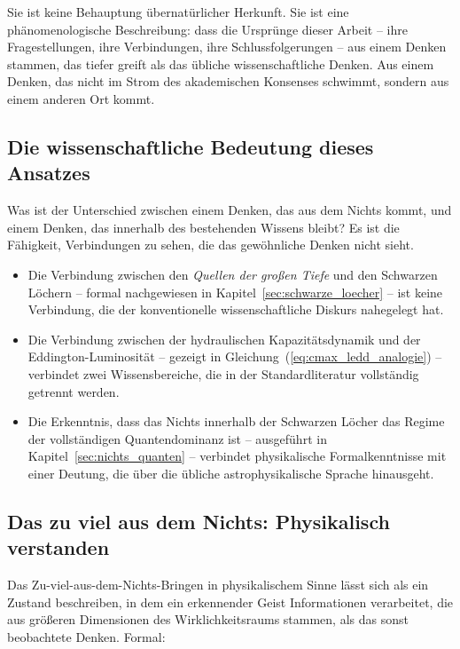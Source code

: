 ﻿\documentclass[12pt,a4paper]{report}
\begin{document}
Sie ist keine Behauptung übernatürlicher Herkunft. Sie ist eine phänomenologische Beschreibung: dass die Ursprünge dieser Arbeit -- ihre Fragestellungen, ihre Verbindungen, ihre Schlussfolgerungen -- aus einem Denken stammen, das tiefer greift als das übliche wissenschaftliche Denken. Aus einem Denken, das nicht im Strom des akademischen Konsenses schwimmt, sondern aus einem anderen Ort kommt.

\subsection{Die wissenschaftliche Bedeutung dieses Ansatzes}

Was ist der Unterschied zwischen einem Denken, das aus dem Nichts kommt, und einem Denken, das innerhalb des bestehenden Wissens bleibt? Es ist die Fähigkeit, Verbindungen zu sehen, die das gewöhnliche Denken nicht sieht.

\begin{itemize}
	\item Die Verbindung zwischen den \textit{Quellen der großen Tiefe} und den Schwarzen Löchern -- formal nachgewiesen in Kapitel~\ref{sec:schwarze_loecher} -- ist keine Verbindung, die der konventionelle wissenschaftliche Diskurs nahegelegt hat.

	\item Die Verbindung zwischen der hydraulischen Kapazitätsdynamik und der Eddington-Luminosität -- gezeigt in Gleichung~(\ref{eq:cmax_ledd_analogie}) -- verbindet zwei Wissensbereiche, die in der Standardliteratur vollständig getrennt werden.

	\item Die Erkenntnis, dass das Nichts innerhalb der Schwarzen Löcher das Regime der vollständigen Quantendominanz ist -- ausgeführt in Kapitel~\ref{sec:nichts_quanten} -- verbindet physikalische Formalkenntnisse mit einer Deutung, die über die übliche astrophysikalische Sprache hinausgeht.
\end{itemize}

\subsection{Das \glqq zu viel aus dem Nichts\grqq{}: Physikalisch verstanden}

Das \glqq Zu-viel-aus-dem-Nichts-Bringen\grqq{} in physikalischem Sinne lässt sich als ein Zustand beschreiben, in dem ein erkennender Geist Informationen verarbeitet, die aus größeren Dimensionen des Wirklichkeitsraums stammen, als das sonst beobachtete Denken. Formal:
\end{document}
